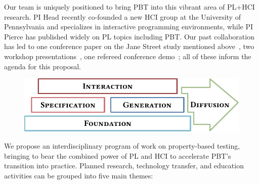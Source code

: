 Our team is uniquely positioned to bring PBT into this vibrant area
of PL+HCI research.  PI Head recently
co-founded a new HCI group at
the University of Pennsylvania and specializes in interactive
programming environments, while PI Pierce has published widely on PL
topics including PBT.  Our past collaboration has led to
one conference paper on the Jane Street study mentioned above~\cite{ref:goldstein2024property},
two workshop
presentations~\cite{goldstein_problems_2022,shi_towards_2023}, one
refereed conference demo~\cite{ref:goldstein2023tyche}; all of these inform the
agenda for this proposal.

\medskip

\begin{figure}
  \vspace*{-2ex}
  \centering
  \includegraphics[width=.6\textwidth]{assets/overview.pdf}
\end{figure}
%
We propose an interdisciplinary program of work on
{property-based testing}, bringing to
bear the combined power of PL and HCI to accelerate PBT's transition
into practice.
%
Planned research,
technology transfer, and education activities can be grouped into five main
themes: \iflater{}\fi
%
